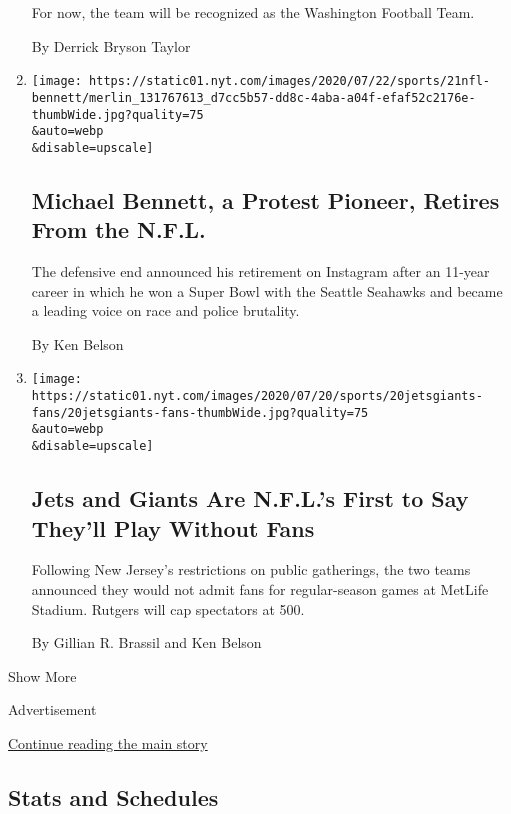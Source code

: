 \begin{enumerate}
  For now, the team will be recognized as the Washington Football Team.

  By Derrick Bryson Taylor
\item
  \href{/2020/07/21/sports/football/michael-bennett-retire-nfl.html}{}

  \texttt{[image: https://static01.nyt.com/images/2020/07/22/sports/21nfl-bennett/merlin\_131767613\_d7cc5b57-dd8c-4aba-a04f-efaf52c2176e-thumbWide.jpg?quality=75\\\&auto=webp\\\&disable=upscale]}

  \hypertarget{michael-bennett-a-protest-pioneer-retires-from-the-nfl}{%
  \subsection{Michael Bennett, a Protest Pioneer, Retires From the
  N.F.L.}\label{michael-bennett-a-protest-pioneer-retires-from-the-nfl}}

  The defensive end announced his retirement on Instagram after an
  11-year career in which he won a Super Bowl with the Seattle Seahawks
  and became a leading voice on race and police brutality.

  By Ken Belson
\item
  \href{/2020/07/20/sports/football/jets-giants-rutgers-fans-metlife-stadium.html}{}

  \texttt{[image: https://static01.nyt.com/images/2020/07/20/sports/20jetsgiants-fans/20jetsgiants-fans-thumbWide.jpg?quality=75\\\&auto=webp\\\&disable=upscale]}

  \hypertarget{jets-and-giants-are-nfls-first-to-say-theyll-play-without-fans}{%
  \subsection{Jets and Giants Are N.F.L.'s First to Say They'll Play
  Without
  Fans}\label{jets-and-giants-are-nfls-first-to-say-theyll-play-without-fans}}

  Following New Jersey's restrictions on public gatherings, the two
  teams announced they would not admit fans for regular-season games at
  MetLife Stadium. Rutgers will cap spectators at 500.

  By Gillian R. Brassil and Ken Belson
\end{enumerate}

Show More

Advertisement

\protect\hyperlink{after-mid1}{Continue reading the main story}

\hypertarget{stats-and-schedules}{%
\subsection{Stats and Schedules}\label{stats-and-schedules}}


